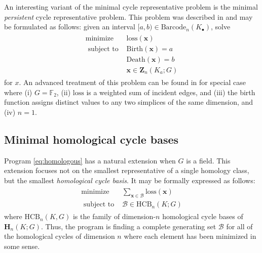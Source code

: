 \documentclass[utf8]{formatting_stuff/frontiersFPHY}
\newcommand{\field}{\mathbb{F}}
\newcommand{\Homologies}[0]{\mathbf{H}}
\newcommand{\Cycles}[0]{\mathbf{Z}}
\newcommand{\optimalrep}{\mathbf{x}}
\newcommand{\birth}{\mathrm{Birth}}
\newcommand{\death}{\mathrm{Death}}
\newcommand{\barcode}{\mathrm{Barcode}}
\newcommand{\loss}{\mathrm{loss}}
\newcommand{\setofhcyclebases}{\mathrm{HCB}}
\newcommand{\pr}{Program }
\newcommand{\hcyclebasis}{\mathcal B}
\theoremstyle{plain}
\theoremstyle{definition}
\providecommand{\DIFaddtex}[1]{{\protect\color{blue}\uwave{#1}}}
\providecommand{\DIFdeltex}[1]{{\protect\color{red}\sout{#1}}}
\providecommand{\DIFaddbegin}{} %
\providecommand{\DIFaddend}{} %
\providecommand{\DIFdelbegin}{} %
\providecommand{\DIFdelend}{} %
\providecommand{\DIFadd}[1]{\texorpdfstring{\DIFaddtex{#1}}{#1}} %
\providecommand{\DIFdel}[1]{\texorpdfstring{\DIFdeltex{#1}}{}} %
\begin{document}
An interesting variant of the minimal cycle representative problem is the minimal \emph{persistent} cycle representative problem.  This problem was described in  \cite{chenquantifying} and may be formulated as follows:  given an interval $[a,b) \in \barcode_n(K_\bullet)$, solve 
\begin{align}
   \begin{split}
    \text{minimize } & \loss(\optimalrep) \\
    \text{ subject to } & \birth(\optimalrep) = a \\
    & \death(\optimalrep) = b \\
    & \optimalrep \in \Cycles_n(K_a; G)
   \end{split}
   \label{eq:minbarcoderep}
\end{align}
for \DIFdelbegin \DIFdel{$x$}\DIFdelend \DIFaddbegin \DIFadd{$\optimalrep$}\DIFaddend .  An advanced treatment of this problem can be found in \cite{chenquantifying} for special case where (i)  $G = \field_2$, (ii) $\loss$ is a weighted sum of incident edges,  and (iii) the birth function assigns distinct values to any two simplices of the same dimension, and (iv) $n=1$.  


\subsection{Minimal homological cycle bases}

\pr \eqref{eq:homologous} has a natural extension when $G$ is a field.  This extension focuses not on the smallest representative of a single homology class, but the smallest  \emph{homological cycle basis}.  It may be formally expressed as follows:
\begin{align}
   \begin{split}
    \text{minimize } & \textstyle \sum_{\optimalrep \in \hcyclebasis} \loss(\optimalrep) \\
    \text{ subject to } & \hcyclebasis \in \setofhcyclebases_n(K ; G)
   \end{split}
   \label{eq:generalminimalbasis}
\end{align}
where $\setofhcyclebases_n(K, G)$ is the family of dimension-$n$ homological cycle bases of $\Homologies_n(K;G)$. Thus, the program is finding a complete generating set $\hcyclebasis$ for all of the homological cycles of dimension $n$ where each element has been minimized in some sense.  
\end{document}
